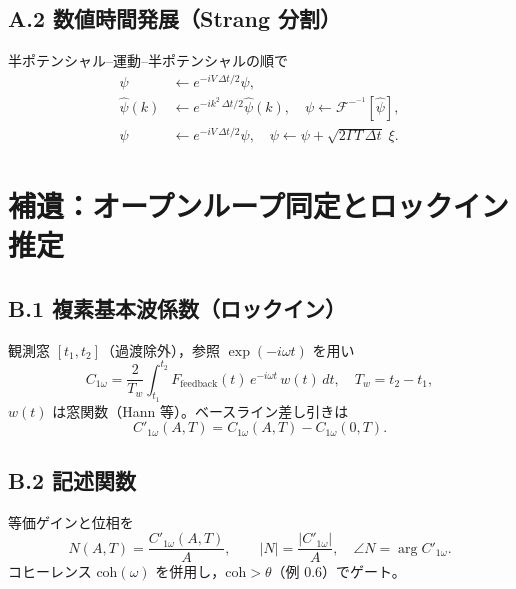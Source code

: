 \documentclass[a4paper,11pt,ja=standard,lualatex]{bxjsarticle}
\begin{document}
\subsection*{A.2 数値時間発展（Strang 分割）}
半ポテンシャル--運動--半ポテンシャルの順で
\begin{align}
 \psi &\leftarrow e^{-i V\,\Delta t/2}\psi,\\
 \hat\psi(k) &\leftarrow e^{-i k^2\,\Delta t/2}\hat\psi(k),\quad \psi\leftarrow \mathcal{F}^{-}^{-1}[\hat\psi],\\
 \psi &\leftarrow e^{-i V\,\Delta t/2}\psi,\quad
 \psi \leftarrow \psi + \sqrt{2\Gamma T\,\Delta t}\;\xi.
\end{align}

\section{補遺：オープンループ同定とロックイン推定}
\label{sec:appendixB}
\subsection*{B.1 複素基本波係数（ロックイン）}
観測窓 $[t_1,t_2]$（過渡除外），参照 $\exp(-i\omega t)$ を用い
\begin{equation}
 C_{1\omega} = \frac{2}{T_w}\int_{t_1}^{t_2}
 F_{\mathrm{feedback}}(t)\,e^{-i\omega t}\,w(t)\,dt,\quad T_w=t_2-t_1,
\end{equation}
$w(t)$ は窓関数（Hann 等）。ベースライン差し引きは
\begin{equation}
 C'_{1\omega}(A,T) = C_{1\omega}(A,T) - C_{1\omega}(0,T).
\end{equation}

\subsection*{B.2 記述関数}
等価ゲインと位相を
\begin{equation}
 N(A,T) = \frac{C'_{1\omega}(A,T)}{A},\qquad
 |N|=\frac{|C'_{1\omega}|}{A},\quad \angle N = \arg C'_{1\omega}.
\end{equation}
コヒーレンス $\mathrm{coh}(\omega)$ を併用し，$\mathrm{coh}>\theta$（例 0.6）でゲート\cite{Welch1967,BendatPiersol2010}。
\end{document}
